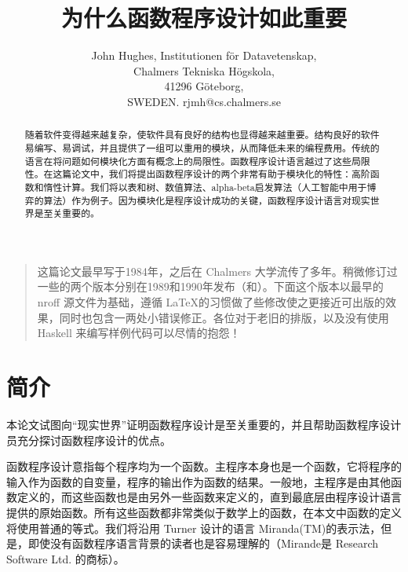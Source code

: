 \documentclass[12pt,a4paper]{article}
\begin{document}
\title{为什么函数程序设计如此重要}
\author{John Hughes, Institutionen f\"or Datavetenskap,\\
Chalmers Tekniska H\"ogskola,\\
41296 G\"oteborg,\\
SWEDEN. rjmh@cs.chalmers.se}
\date{}

\maketitle

\begin{quotation}这篇论文最早写于1984年，之后在 Chalmers 大学流传了多年。稍微修订过一些的两个版本分别在1989和1990年发布（\cite[Hug89]{Hug89}和\cite[Hug90]{Hug90}）。下面这个版本以最早的 nroff 源文件为基础，遵循 \LaTeX 的习惯做了些修改使之更接近可出版的效果，同时也包含一两处小错误修正。各位对于老旧的排版，以及没有使用 Haskell 来编写样例代码可以尽情的抱怨！\end{quotation}

\clearpage

\begin{abstract}随着软件变得越来越复杂，使软件具有良好的结构也显得越来越重要。结构良好的软件易编写、易调试，并且提供了一组可以重用的模块，从而降低未来的编程费用。传统的语言在将问题如何模块化方面有概念上的局限性。函数程序设计语言越过了这些局限性。在这篇论文中，我们将提出函数程序设计的两个非常有助于模块化的特性：高阶函数和惰性计算。我们将以表和树、数值算法、alpha-beta启发算法（人工智能中用于博弈的算法）作为例子。因为模块化是程序设计成功的关键，函数程序设计语言对现实世界是至关重要的。\end{abstract}

\clearpage

\tableofcontents

\clearpage

\section{简介}

本论文试图向``现实世界''证明函数程序设计是至关重要的，并且帮助函数程序设计员充分探讨函数程序设计的优点。

函数程序设计意指每个程序均为一个函数。主程序本身也是一个函数，它将程序的输入作为函数的自变量，程序的输出作为函数的结果。一般地，主程序是由其他函数定义的，而这些函数也是由另外一些函数来定义的，直到最底层由程序设计语言提供的原始函数。所有这些函数都非常类似于数学上的函数，在本文中函数的定义将使用普通的等式。我们将沿用 Turner 设计的语言 Miranda(TM)\cite[Tur85]{Tur85}的表示法，但是，即使没有函数程序语言背景的读者也是容易理解的（Mirande是 Research Software Ltd. 的商标）。
\end{document}
